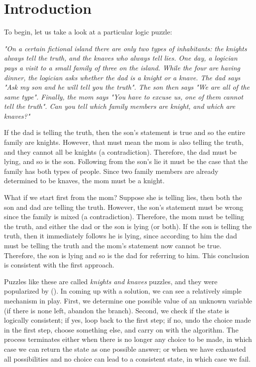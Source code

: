 \section{Introduction}

To begin, let us take a look at a particular logic puzzle:

{\small\textit{"On a certain fictional island there are only two types of inhabitants: the knights always tell the truth, and the knaves who always tell lies. One day, a logician pays a visit to a small family of three on the island. While the four are having dinner, the logician asks whether the dad is a knight or a knave. The dad says "Ask my son and he will tell you the truth". The son then says "We are all of the same type". Finally, the mom says "You have to excuse us, one of them cannot tell the truth". Can you tell which family members are knight, and which are knaves?"}}

If the dad is telling the truth, then the son's statement is true and so the entire family are knights. However, that must mean the mom is also telling the truth, and they cannot all be knights (a contradiction). Therefore, the dad must be lying, and so is the son. Following from the son's lie it must be the case that the family has both types of people. Since two family members are already determined to be knaves, the mom must be a knight.

What if we start first from the mom? Suppose she is telling lies, then both the son and dad are telling the truth. However, the son's statement must be wrong since the family is mixed (a contradiction). Therefore, the mom must be telling the truth, and either the dad or the son is lying (or both). If the son is telling the truth, then it immediately follows he is lying, since according to him the dad must be telling the truth and the mom's statement now cannot be true. Therefore, the son is lying and so is the dad for referring to him. This conclusion is consistent with the first approach.

Puzzles like these are called \textit{knights and knaves} puzzles, and they were popularized by (\cite{knight}). In coming up with a solution, we can see a relatively simple mechanism in play. First, we determine one possible value of an unknown variable (if there is none left, abandon the branch). Second, we check if the state is logically consistent; if yes, loop back to the first step; if no, undo the choice made in the first step, choose something else, and carry on with the algorithm. The process terminates either when there is no longer any choice to be made, in which case we can return the state as one possible answer; or when we have exhausted all possibilities and no choice can lead to a consistent state, in which case we fail.

